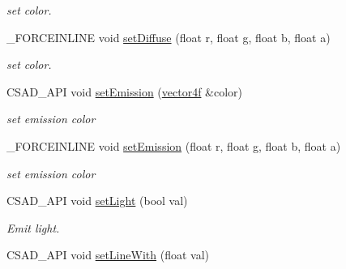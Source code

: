 \begin{DoxyCompactItemize}
\begin{DoxyCompactList}\small\item\em set color. \end{DoxyCompactList}\item 
\hypertarget{classcsad_1_1_material_a49ce166a7ab43f03e0de583308f1f956}{\-\_\-\-F\-O\-R\-C\-E\-I\-N\-L\-I\-N\-E void \hyperlink{classcsad_1_1_material_a49ce166a7ab43f03e0de583308f1f956}{set\-Diffuse} (float r, float g, float b, float a)}\label{classcsad_1_1_material_a49ce166a7ab43f03e0de583308f1f956}

\begin{DoxyCompactList}\small\item\em set color. \end{DoxyCompactList}\item 
\hypertarget{classcsad_1_1_material_af7522a5ab3b5fb514940e1ea0889a27c}{C\-S\-A\-D\-\_\-\-A\-P\-I void \hyperlink{classcsad_1_1_material_af7522a5ab3b5fb514940e1ea0889a27c}{set\-Emission} (\hyperlink{classbt_1_1vector4f}{vector4f} \&color)}\label{classcsad_1_1_material_af7522a5ab3b5fb514940e1ea0889a27c}

\begin{DoxyCompactList}\small\item\em set emission color \end{DoxyCompactList}\item 
\hypertarget{classcsad_1_1_material_a2917427c5332354bb23fc9c3d535f075}{\-\_\-\-F\-O\-R\-C\-E\-I\-N\-L\-I\-N\-E void \hyperlink{classcsad_1_1_material_a2917427c5332354bb23fc9c3d535f075}{set\-Emission} (float r, float g, float b, float a)}\label{classcsad_1_1_material_a2917427c5332354bb23fc9c3d535f075}

\begin{DoxyCompactList}\small\item\em set emission color \end{DoxyCompactList}\item 
\hypertarget{classcsad_1_1_material_ac9450c272697b766603235851dd33f03}{C\-S\-A\-D\-\_\-\-A\-P\-I void \hyperlink{classcsad_1_1_material_ac9450c272697b766603235851dd33f03}{set\-Light} (bool val)}\label{classcsad_1_1_material_ac9450c272697b766603235851dd33f03}

\begin{DoxyCompactList}\small\item\em Emit light. \end{DoxyCompactList}\item 
\hypertarget{classcsad_1_1_material_ab077e1d2feb25d8204d56343e1c45738}{C\-S\-A\-D\-\_\-\-A\-P\-I void \hyperlink{classcsad_1_1_material_ab077e1d2feb25d8204d56343e1c45738}{set\-Line\-With} (float val)}\label{classcsad_1_1_material_ab077e1d2feb25d8204d56343e1c45738}


\end{DoxyCompactItemize}

